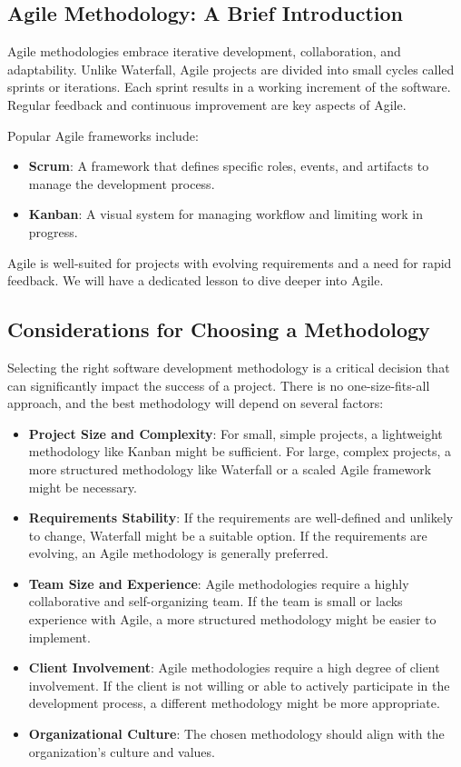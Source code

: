 \subsection{Agile Methodology: A Brief Introduction}

Agile methodologies embrace iterative development, collaboration, and
adaptability. Unlike Waterfall, Agile projects are divided into small cycles
called sprints or iterations. Each sprint results in a working increment of the
software. Regular feedback and continuous improvement are key aspects of Agile.

Popular Agile frameworks include:

\begin{itemize}
  \item \textbf{Scrum}: A framework that defines specific roles, events, and artifacts to manage the development process.
  \item \textbf{Kanban}: A visual system for managing workflow and limiting work in progress.
\end{itemize}

Agile is well-suited for projects with evolving requirements and a need for
rapid feedback. We will have a dedicated lesson to dive deeper into Agile.

\subsection{Considerations for Choosing a Methodology}

Selecting the right software development methodology is a critical decision
that can significantly impact the success of a project. There is no
one-size-fits-all approach, and the best methodology will depend on several
factors:

\begin{itemize}
  \item \textbf{Project Size and Complexity}: For small, simple projects, a lightweight methodology like Kanban might be sufficient. For large, complex projects, a more structured methodology like Waterfall or a scaled Agile framework might be necessary.
  \item \textbf{Requirements Stability}: If the requirements are well-defined and unlikely to change, Waterfall might be a suitable option. If the requirements are evolving, an Agile methodology is generally preferred.
  \item \textbf{Team Size and Experience}: Agile methodologies require a highly collaborative and self-organizing team. If the team is small or lacks experience with Agile, a more structured methodology might be easier to implement.
  \item \textbf{Client Involvement}: Agile methodologies require a high degree of client involvement. If the client is not willing or able to actively participate in the development process, a different methodology might be more appropriate.
  \item \textbf{Organizational Culture}: The chosen methodology should align with the organization's culture and values.
\end{itemize}

